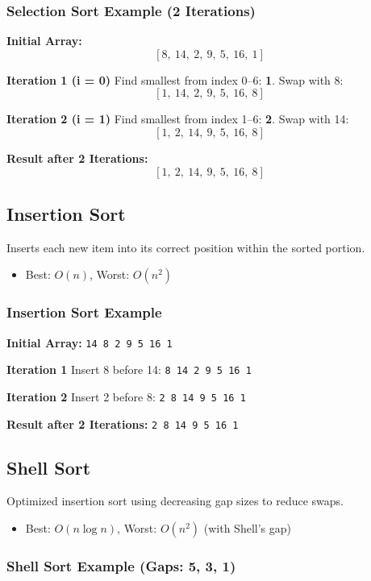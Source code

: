\documentclass[11pt]{article}
\begin{document}
\subsubsection*{Selection Sort Example (2 Iterations)}
\textbf{Initial Array:}
\[
[8,\ 14,\ 2,\ 9,\ 5,\ 16,\ 1]
\]

\textbf{Iteration 1 (i = 0)}  
Find smallest from index 0–6: \textbf{1}. Swap with 8:
\[
[1,\ 14,\ 2,\ 9,\ 5,\ 16,\ 8]
\]

\textbf{Iteration 2 (i = 1)}  
Find smallest from index 1–6: \textbf{2}. Swap with 14:
\[
[1,\ 2,\ 14,\ 9,\ 5,\ 16,\ 8]
\]

\textbf{Result after 2 Iterations:}
\[
\boxed{[1,\ 2,\ 14,\ 9,\ 5,\ 16,\ 8]}
\]

\subsection*{Insertion Sort}
Inserts each new item into its correct position within the sorted portion.

\begin{itemize}
  \item Best: $O(n)$, Worst: $O(n^2)$
\end{itemize}

\subsubsection*{Insertion Sort Example}
\textbf{Initial Array:} \texttt{14 8 2 9 5 16 1}

\textbf{Iteration 1}  
Insert 8 before 14:  
\texttt{8 14 2 9 5 16 1}

\textbf{Iteration 2}  
Insert 2 before 8:  
\texttt{2 8 14 9 5 16 1}

\textbf{Result after 2 Iterations:}  
\texttt{2 8 14 9 5 16 1}

\subsection*{Shell Sort}
Optimized insertion sort using decreasing gap sizes to reduce swaps.

\begin{itemize}
  \item Best: $O(n \log n)$, Worst: $O(n^2)$ (with Shell's gap)
\end{itemize}

\subsubsection*{Shell Sort Example (Gaps: 5, 3, 1)}
\end{document}
